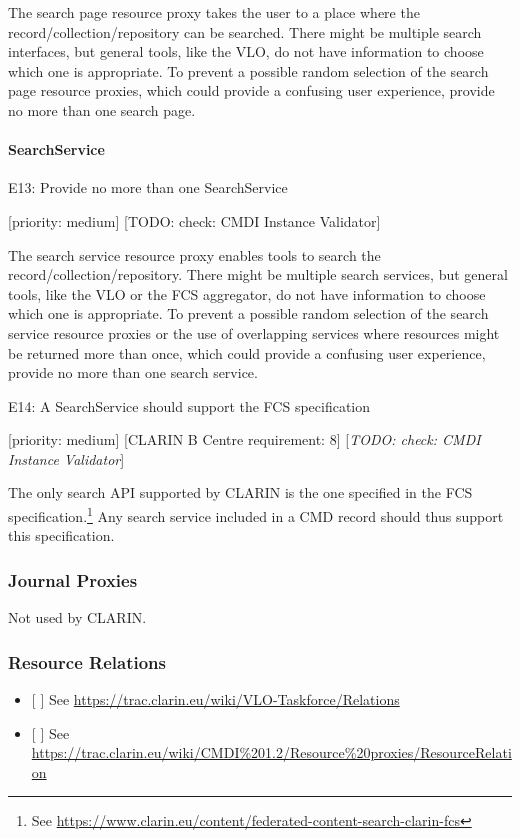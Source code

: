 The search page resource proxy takes the user to a place where the
record/collection/repository can be searched. There might be multiple
search interfaces, but general tools, like the VLO, do not have
information to choose which one is appropriate. To prevent a possible
random selection of the search page resource proxies, which could
provide a confusing user experience, provide no more than one search
page.

\paragraph{SearchService}\label{searchservice}

E13: Provide no more than one SearchService

{[}priority: medium{]} {[}TODO: check: CMDI Instance Validator{]}

The search service resource proxy enables tools to search the
record/collection/repository. There might be multiple search services,
but general tools, like the VLO or the FCS aggregator, do not have
information to choose which one is appropriate. To prevent a possible
random selection of the search service resource proxies or the use of
overlapping services where resources might be returned more than once,
which could provide a confusing user experience, provide no more than
one search service.

E14: A SearchService should support the FCS specification

{[}priority: medium{]} {[}CLARIN B Centre requirement: 8{]}
{[}\emph{TODO: check: CMDI Instance Validator}{]}

The only search API supported by CLARIN is the one specified in the FCS
specification.\footnote{See
  \url{https://www.clarin.eu/content/federated-content-search-clarin-fcs}}
Any search service included in a CMD record should thus support this
specification.

\subsubsection{Journal Proxies}\label{journal-proxies}

Not used by CLARIN.

\subsubsection{Resource Relations}\label{resource-relations}

\begin{itemize}
\item
  {[} {]} See \url{https://trac.clarin.eu/wiki/VLO-Taskforce/Relations}
\item
  {[} {]} See
  \url{https://trac.clarin.eu/wiki/CMDI\%201.2/Resource\%20proxies/ResourceRelation}
\end{itemize}

